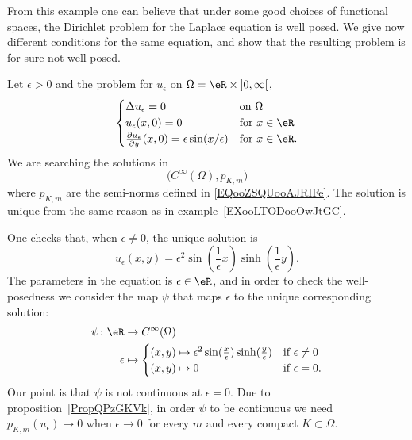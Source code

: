 From this example one can believe that under some good choices of functional spaces, the Dirichlet problem for the Laplace equation is well posed. We give now different conditions for the same equation, and show that the resulting problem is for sure not well posed.

\begin{example}
Let \( \epsilon>0\) and the problem for \( u_{\epsilon}\) on \( \Omega=\eR\times \mathopen] 0 , \infty \mathclose[\),
    \begin{equation}        \label{EQooUBUEooMCDIlZ}
         \begin{cases}
             \Delta u_{\epsilon}=0    &   \text{on } \Omega\\
             u_{\epsilon}(x,0)=0    &    \text{for } x\in \eR \\
             \frac{ \partial u_{\epsilon} }{ \partial y }(x,0)=\epsilon\sin(x/\epsilon)    &    \text{for }x\in \eR.
         \end{cases}
     \end{equation}
     We are searching the solutions in
     \begin{equation}
         \big(  C^{\infty}(\Omega),p_{K,m} \big)
     \end{equation}
     where \( p_{K,m}\) are the semi-norms defined in \eqref{EQooZSQUooAJRIFe}. The solution is unique from the same reason as in example~\ref{EXooLTODooOwJtGC}.

     One checks that, when \( \epsilon\neq 0\), the unique solution is
     \begin{equation}
         u_{\epsilon}(x,y)=\epsilon^2\sin(\frac{1}{ \epsilon }x)\sinh(\frac{1}{ \epsilon }y).
     \end{equation}
     The parameters in the equation is \( \epsilon\in \eR\), and in order to check the well-posedness we consider the map \( \psi\) that maps \( \epsilon\) to the unique corresponding solution:
     \begin{equation}
         \begin{aligned}
             \psi\colon \eR&\to  C^{\infty}(\Omega) \\
             \epsilon&\mapsto \begin{cases}
                 (x,y)\mapsto \epsilon^2\sin(\frac{ x }{ \epsilon })\sinh(\frac{ y }{ \epsilon })   &   \text{if } \epsilon\neq 0\\
                 (x,y)\mapsto 0 &    \text{if } \epsilon=0.
             \end{cases}
         \end{aligned}
     \end{equation}
     Our point is that \( \psi\) is not continuous at \( \epsilon=0\). Due to proposition~\ref{PropQPzGKVk}, in order \( \psi\) to be continuous we need \( p_{K,m}(u_{\epsilon})\to 0\) when \( \epsilon\to 0\) for every \( m\) and every compact \( K\subset \Omega\).


\end{example}
